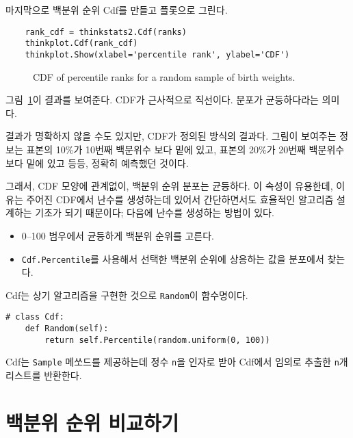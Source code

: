 마지막으로 백분위 순위 Cdf를 만들고 플롯으로 그린다.


\begin{verbatim}
    rank_cdf = thinkstats2.Cdf(ranks)
    thinkplot.Cdf(rank_cdf)
    thinkplot.Show(xlabel='percentile rank', ylabel='CDF')
\end{verbatim}

\begin{figure}
\caption{CDF of percentile ranks for a random sample of birth weights.}
\label{cumulative_random}
\end{figure}

그림~\ref{cumulative_random}이 결과를 보여준다.
CDF가 근사적으로 직선이다. 분포가 균등하다라는 의미다. 

결과가 명확하지 않을 수도 있지만, CDF가 정의된 방식의 결과다.
그림이 보여주는 정보는 표본의 10\%가 10번째 백분위수 보다 밑에 있고,
표본의 20\%가 20번째 백분위수 보다 밑에 있고 등등, 정확히 예측했던 것이다.

그래서, CDF 모양에 관계없이, 백분위 순위 분포는 균등하다. 
이 속성이 유용한데, 이유는 주어진 CDF에서 난수를 생성하는데 있어서 간단하면서도 효율적인 알고리즘 설계하는 기초가 되기 때문이다; 다음에 난수를 생성하는 방법이 있다.


\begin{itemize}

\item 0--100 범우에서 균등하게 백분위 순위를 고른다.

\item {\tt Cdf.Percentile}를 사용해서 선택한 백분위 순위에 상응하는 값을 분포에서 찾는다.

\end{itemize}

Cdf는 상기 알고리즘을 구현한 것으로 {\tt Random}이 함수명이다.

\begin{verbatim}
# class Cdf:
    def Random(self):
        return self.Percentile(random.uniform(0, 100))
\end{verbatim}

Cdf는 {\tt Sample} 메쏘드를 제공하는데 정수 {\tt n}을
인자로 받아 Cdf에서 임의로 추출한 {\tt n}개 리스트를 반환한다.


\section{백분위 순위 비교하기}

